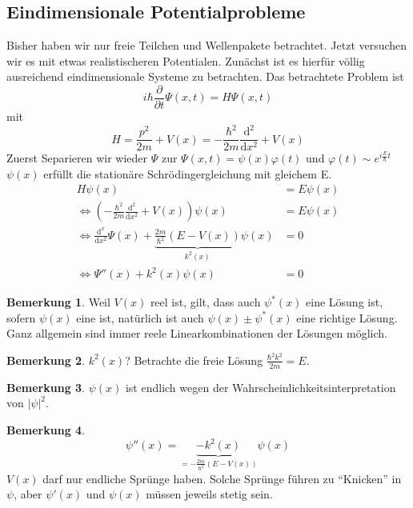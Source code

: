 \documentclass[oneside]{book}
\theoremstyle{definition}
\newtheorem*{bemerkung*}{Bemerkung}
\renewcommand{\d}{\mathrm d}
\newcommand{\ddd}[2]{\frac{\d #1}{\d #2}}
\newcommand{\fpartial}[1]{\frac{\partial}{\partial #1}}
\newcommand{\vp}{\varphi}
\begin{document}
\subsection{Eindimensionale Potentialprobleme}
Bisher haben wir nur freie Teilchen und Wellenpakete betrachtet. Jetzt versuchen wir es mit etwas realistischeren Potentialen. Zunächst ist es hierfür völlig ausreichend eindimensionale Systeme zu betrachten. Das betrachtete Problem ist
$$i\hbar \fpartial{t} \Psi(x, t) = H \Psi(x, t)$$
mit
$$H = \frac{p^2}{2m} + V(x) = - \frac{\hbar^2}{2m} \ddd{^2}{x^2} + V(x)$$
Zuerst Separieren wir wieder $\Psi$ zur $\Psi(x, t) = \psi(x) \vp(t)$ und $\vp(t) \sim e^{i \frac{E}{\hbar} t}$\\
$\psi(x)$ erfüllt die stationäre Schrödingergleichung mit gleichem E.
\begin{align*}
	H \psi(x) &= E \psi(x)\\
	\Leftrightarrow (- \frac{\hbar^2}{2m} \ddd{^2}{x^2} + V(x)) \psi(x) &= E \psi(x)\\
	\Leftrightarrow \ddd{^x}{x^2} \Psi(x) + \underbrace{\frac{2m}{\hbar^2}(E - V(x))}_{k^2(x)} \psi(x) &= 0\\
	\Leftrightarrow \Psi''(x) + k^2(x) \psi(x) &= 0
\end{align*}

\begin{bemerkung*}
	Weil $V(x)$ reel ist, gilt, dass auch $\psi^\ast(x)$ eine Lösung ist, sofern $\psi(x)$ eine ist, natürlich ist auch $\psi(x) \pm \psi^\ast(x)$ eine richtige Lösung. Ganz allgemein sind immer reele Linearkombinationen der Lösungen möglich.
\end{bemerkung*}

\begin{bemerkung*}
	$k^2(x)$? Betrachte die freie Lösung $\frac{\hbar^2 k^2}{2m} = E$.
\end{bemerkung*}

\begin{bemerkung*}
	$\psi(x)$ ist endlich wegen der Wahrscheinlichkeitsinterpretation von $|\psi|^2$.
\end{bemerkung*}

\begin{bemerkung*}
	$$\psi''(x) = \underbrace{- k^2(x)}_{= - \frac{2m}{\hbar^2} (E - V(x))} \psi(x)$$
	$V(x)$ darf nur endliche Sprünge haben. Solche Sprünge führen zu "`Knicken"' in $\psi$, aber $\psi'(x)$ und $\psi(x)$ müssen jeweils stetig sein.
\end{bemerkung*}
\end{document}
